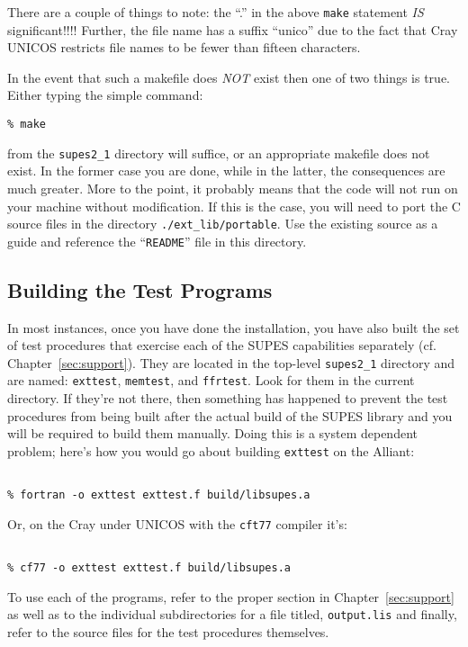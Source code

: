 There are a couple of things to note:
the ``.'' in the above
\verb+make+ statement {\em IS} significant!!!!
Further,
the file name has a suffix ``unico'' due to the fact that
Cray UNICOS restricts file names to be fewer than
fifteen characters.

In the event that such a makefile does {\em NOT} exist then one of two
things is true.
Either typing the simple command:
\begin{verbatim}
% make
\end{verbatim}
from the \verb+supes2_1+ directory will suffice,
or an appropriate makefile does not exist.
In the former case you are done, while
in the latter,
the consequences are much greater.
More to the point,
it probably means that the code will not run on your machine
without modification.
If this is the case, you will need to port the C source files in
the directory \verb+./ext_lib/portable+.  Use the existing source as a
guide and reference the ``\verb+README+'' file in this directory.

\subsection{Building the Test Programs}
In most instances,
once you have done the installation,
you have also built the
set of test procedures that exercise each of the SUPES
capabilities separately (cf. Chapter~\ref{sec:support}).
They are located in the top-level \verb+supes2_1+ directory
and are named:
\verb+exttest+,
\verb+memtest+,
and \verb+ffrtest+.
Look for them in the current directory.
If they're not there,
then
something has happened to prevent the test procedures
from being built after the actual build of the SUPES library
and
you will be required to build them manually.
Doing this is a system dependent problem;
here's how you would go about building \verb+exttest+ on the Alliant:
\begin{verbatim}

% fortran -o exttest exttest.f build/libsupes.a

\end{verbatim}
Or,
on the Cray under UNICOS with the \verb+cft77+ compiler it's:
\begin{verbatim}

% cf77 -o exttest exttest.f build/libsupes.a

\end{verbatim}
To use each of the programs, refer to the
proper section in Chapter~\ref{sec:support}
as well as to the
individual subdirectories for a file titled,
\verb+output.lis+
and finally,
refer
to the source files for the test procedures themselves.

